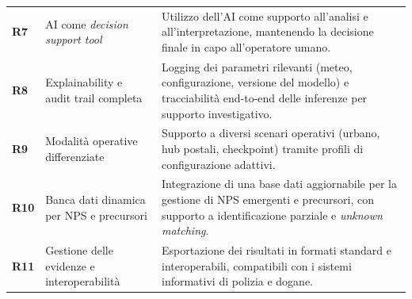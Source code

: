 \begin{longtable}{>{\bfseries}p{1cm} p{4cm} p{7cm}}
    R7  & AI come \emph{decision support tool}              &
    Utilizzo dell’AI come supporto all’analisi e all’interpretazione, mantenendo la decisione finale in capo all’operatore umano.                                                                                                                                                                                                                                                                                                                     \\

    R8  & Explainability e audit trail completa             &
    Logging dei parametri rilevanti (meteo, configurazione, versione del modello) e tracciabilità end-to-end delle inferenze per supporto investigativo.                                                                                                                                                                                                                                                                                              \\

    R9  & Modalità operative differenziate                  &
    Supporto a diversi scenari operativi (urbano, hub postali, checkpoint) tramite profili di configurazione adattivi.                                                                                                                                                                                                                                                                                                                                \\

    R10 & Banca dati dinamica per NPS e precursori          &
    Integrazione di una base dati aggiornabile per la gestione di NPS emergenti e precursori, con supporto a identificazione parziale e \emph{unknown matching}.                                                                                                                                                                                                                                                                                      \\

    R11 & Gestione delle evidenze e interoperabilità        &
    Esportazione dei risultati in formati standard e interoperabili, compatibili con i sistemi informativi di polizia e dogane.                                                                                                                                                                                                                                                                                                                       \\


\end{longtable}
